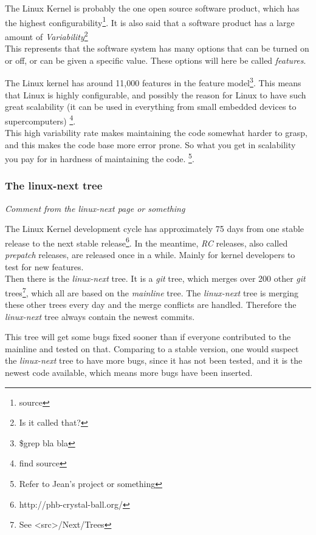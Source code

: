 \documentclass[a4paper,11pt]{article}
\begin{document}
The Linux Kernel is probably the one open source software product, which has 
the highest configurability\footnote{source}. It is also said that a software 
product has a large amount of \emph{Variability}\footnote{Is it called that?} \\


This represents that the software system has many options that can be turned 
on or off, or can be given a specific value. These options will here be called 
\emph{features}.

The Linux kernel has around 11,000 features in the feature 
model\footnote{\$grep bla bla}. This means that Linux is highly configurable, 
and possibly the reason for Linux to have such great scalability (it can be 
used in everything from small embedded devices to supercomputers) 
\footnote{find source}. \\


This high variability rate makes maintaining the code somewhat harder to 
grasp, and this makes the code base more error prone. So what you get in 
scalability you pay for in hardness of maintaining the code. \footnote{Refer 
to Jean's project or something}.


\subsubsection{The linux-next tree}

\begin{center}
    \emph{
        Comment from the linux-next page or something
    }
\end{center}

The Linux Kernel development cycle has approximately 75 days from one stable 
release to the next stable release\footnote{http://phb-crystal-ball.org/}. In 
the meantime, \emph{RC} releases, also called \emph{prepatch} releases, are 
released once in a while. Mainly for kernel developers to test for new features.
\\


Then there is the \emph{linux-next} tree. It is a \emph{git} tree, which 
merges over 200 other \emph{git} trees\footnote{See <src>/Next/Trees}, which 
all are based on the \emph{mainline} tree. The \emph{linux-next} tree is 
merging these other trees every day and the merge conflicts are handled. 
Therefore the \emph{linux-next} tree always contain the newest commits. 

This tree will get some bugs fixed sooner than if everyone contributed to the 
mainline and tested on that. Comparing to a stable version, one would suspect 
the \emph{linux-next} tree to have more bugs, since it has not been tested, 
and it is the newest code available, which means more bugs have been inserted. 
\\
\end{document}
